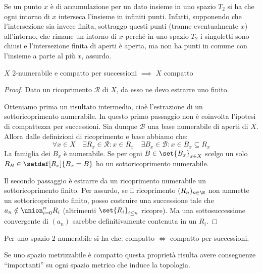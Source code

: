 \begin{oss}
	Se un punto $x$ è di accumulazione per un dato insieme in uno spazio $T_2$
	si ha che ogni intorno di $x$ interseca l'insieme in infiniti punti.
	Infatti, supponendo che l'intersezione sia invece finita,
	sottraggo questi punti (tranne eventualmente $x$) all'intorno,
	che rimane un intorno di $x$ perché in uno spazio $T_2$ i singoletti sono chiusi
	e l'intersezione finita di aperti è aperta,
	ma non ha punti in comune con l'insieme a parte al più $x$, assurdo.
\end{oss}

\begin{prop}
	$X$ 2-numerabile e compatto per successioni $\implies$ $X$ compatto
\end{prop}

\begin{proof}
	Dato un ricoprimento $\mathcal R$ di $X$, da esso ne devo estrarre uno finito.
	
	Otteniamo prima un risultato intermedio, cioè l'estrazione di un sottoricoprimento numerabile.
	In questo primo passaggio non è coinvolta l'ipotesi di compattezza per successioni.
	Sia dunque $\mathcal B$ una base numerabile di aperti di $X$.
	Allora dalle definizioni di ricoprimento e base abbiamo che:
	\[\forall x\in X \quad
	\exists R_x \in \mathcal R : x\in R_x \quad
	\exists B_x \in \mathcal B : x\in B_x \subseteq R_x\]
	La famiglia dei $B_x$ è numerabile.
	Se per ogni $B\in\set{B_x}_{x\in X}$ scelgo un solo $R_B\in\setdef[R_x]{B_x=B}$ ho un sottoricoprimento numerabile.
	
	Il secondo passaggio è estrarre da un ricoprimento numerabile un sottoricoprimento finito.
	Per assurdo, se il ricoprimento $(R_n)_{n\in \N}$ non ammette un sottoricoprimento finito,
	posso costruire una successione tale che $a_n\notin\union_{i=0}^nR_i$
	(altrimenti $\set{R_i}_{i\le n}$ ricopre).
	Ma una sottosuccessione convergente di $(a_n)$ sarebbe definitivamente contenuta in un $R_i$.
\end{proof}

\begin{cor}
	Per uno spazio 2-numerabile si ha che: compatto $\iff$ compatto per successioni.
\end{cor}


Se uno spazio metrizzabile è compatto questa proprietà risulta avere conseguenze ``importanti'' su ogni spazio metrico che induce la topologia.


